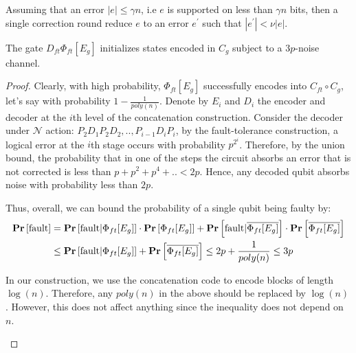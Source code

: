 \documentclass[manuscript,screen,review]{acmart}
\begin{document}
{\begin{claim}
  \label{claim:error} 
  Assuming that an error $|e| \le \gamma n $, i.e $e$ is supported on less than $\gamma n$ bits, then a single correction round reduce $e$ to an error $e^\prime$ such that $|e^{\prime}| < \nu |e|$. 
\end{claim}
\begin{claim}
  \label{claim:noisepa}
  The gate $ D_{ft} \Phi_{ft}[E_{g}]$ initializes states encoded in $C_{g}$ subject to a $3p$-noise channel.  
\end{claim}
\begin{proof}
  Clearly, with high probability, $\Phi_{ft}[E_{g}]$ successfully encodes into $C_{ft} \circ C_{g}$, let's say with probability $1 - \frac{1}{poly(n)}$. Denote by $E_{i}$ and $D_{i}$ the encoder and decoder at the $i$th level of the concatenation construction. Consider the decoder under $\mathcal{N}$ action: $P_{2}D_{1}P_{2}D_{2},..,P_{i-1}D_{i}P_{i}$, by the fault-tolerance construction, a logical error at the $i$th stage occurs with probability $p^{2^{i}}$. Therefore, by the union bound, the probability that in one of the steps the circuit absorbs an error that is not corrected is less than $p + p^{2} + p^{4} + .. < 2p$. Hence, any decoded qubit absorbs noise with probability less than $2p$.


  Thus, overall, we can bound the probability of a single qubit being faulty by:
  \begin{equation*}
    \begin{split}
      \mathbf{Pr} \left[ \text{fault}  \right] &=  \mathbf{Pr} \left[ \text{fault} |  \Phi_{ft}[E_{g}]  \right]\cdot \mathbf{Pr} \left[ \Phi_{ft}[E_{g}] \right] + \mathbf{Pr} \left[ \text{fault} | \overline{\Phi_{ft}[E_{g}]}  \right]\cdot \mathbf{Pr} \left[ \overline{\Phi_{ft}[E_{g}]} \right]\\
      &\le  \mathbf{Pr} \left[ \text{fault} |  \Phi_{ft}[E_{g}]  \right] + \mathbf{Pr} \left[ \overline{\Phi_{ft}[E_{g}]} \right] \le 2p + \frac{1}{poly(n)} \le 3p
    \end{split}
  \end{equation*}

  \begin{remark}
In our construction, we use the concatenation code to encode blocks of length $\log(n)$. Therefore, any $poly(n)$ in the above should be replaced by $\log(n)$. However, this does not affect anything since the inequality does not depend on $n$.
  \end{remark}


\end{proof}}
\end{document}
